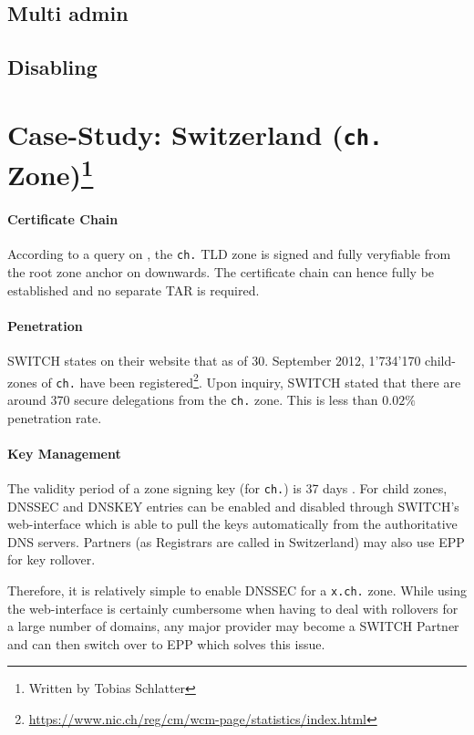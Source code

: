 \documentclass[a4paper,twocolumn]{scrartcl}
\newcommand{\wbts}{\protect\footnote{Written by Tobias Schlatter}}
\begin{document}
\subsection{Multi admin}
\subsection{Disabling}

\section{Case-Study: Switzerland (\texttt{ch.} Zone)\wbts}
\label{sec:case-study}

\paragraph{Certificate Chain} According to a query on
\cite{secspider}, the \verb|ch.| TLD zone is signed and fully
veryfiable from the root zone anchor on downwards. The certificate
chain can hence fully be established and no separate TAR is required.

\paragraph{Penetration} SWITCH states on their website that as of
30. September 2012, 1'734'170 child-zones of \verb|ch.| have been
registered\footnote{\url{https://www.nic.ch/reg/cm/wcm-page/statistics/index.html}}. Upon
inquiry, SWITCH stated that there are around 370 secure delegations
from the \verb|ch.| zone. This is less than $0.02\%$ penetration
rate.

\paragraph{Key Management} The validity period of a zone signing key
(for \verb|ch.|) is 37 days \cite{switch10}. For child zones,  DNSSEC
and DNSKEY entries can be enabled and disabled through SWITCH's 
web-interface which is able to pull the keys automatically from the
authoritative DNS servers. Partners (as Registrars are called in
Switzerland) may also use EPP for key rollover.

Therefore, it is relatively simple to enable DNSSEC for a \verb|x.ch.| 
zone. While using the web-interface is certainly cumbersome when
having to deal with rollovers for a large number of domains, any major
provider may become a SWITCH Partner and can then switch over to EPP
which solves this issue.

\nocite{*}


\end{document}

